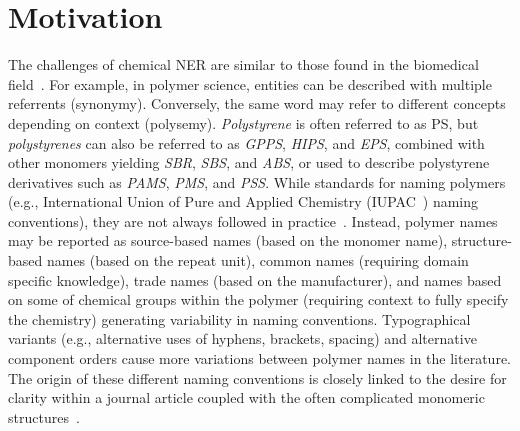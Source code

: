 \section{Motivation}
\label{sect:background}
The challenges of chemical NER are similar to those found in the biomedical field~\cite{krallinger2015chemdner,kim2004introduction}. 
For example, in polymer science, entities can be described with multiple referrents (synonymy).
Conversely, the same word may refer to different concepts depending on context (polysemy).
\textit{Polystyrene} is often referred to as PS, but \textit{polystyrenes} can also be referred to as \textit{GPPS}, \textit{HIPS}, and \textit{EPS}, combined with other monomers yielding \textit{SBR}, \textit{SBS}, and \textit{ABS}, or used to describe polystyrene derivatives such as \textit{PAMS}, \textit{PMS}, and \textit{PSS}.
While standards for naming polymers (e.g., International Union of Pure and Applied Chemistry (IUPAC~\cite{hiorns2013brief}) naming conventions), they are not always followed in practice~\cite{tamames2006success}. 
Instead, polymer names may be reported as source-based names (based on the monomer name), structure-based names (based on the repeat unit), common names (requiring domain specific knowledge), trade names (based on the manufacturer), and names based on some of chemical groups within the polymer (requiring context to fully specify the chemistry) generating variability in naming conventions.
Typographical variants (e.g., alternative uses of hyphens, brackets, spacing) and alternative component orders cause more variations between polymer names in the literature.
The origin of these different naming conventions is closely linked to the desire for clarity within a journal article coupled with the often complicated monomeric structures~\cite{audus2017polymer}.

